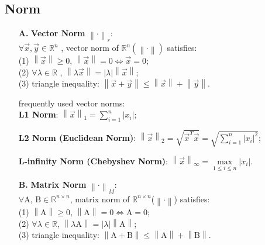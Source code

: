 \documentclass[12pt]{book}
\theoremstyle{definition}
\theoremstyle{remark}
\begin{document}
\subsection{Norm}
\begin{enumerate}
    \item [\textbf{A.}] \textbf{Vector Norm} $\left \| \cdot  \right \| _{r} $:\\
    $\forall\vec{x},\vec{y}\in\mathbb{R}^{n}$ , vector norm of $\mathbb{R}^{n} (\left \| \cdot  \right \|)$ satisfies:\\
(1) $\left \| \vec{x}  \right \|\ge0$, $\left \| \vec{x}  \right \|=0\Leftrightarrow \vec{x}=0$; \\
(2) $\forall\lambda\in\mathbb{R}$ , $\left \| \lambda\vec{x} \right \| =\left | \lambda  \right | \left \| \vec{x} \right \|$; \\
(3) triangle inequality: $\left \| \vec{x}+\vec{y} \right \| \le \left \| \vec{x} \right \| + \left \| \vec{y} \right \|$.\\
\begin{notionbox}[Note]
frequently used vector norms:\\
\textbf{L1 Norm}: $\left \| \vec{x} \right \|_{1} =\sum_{i=1}^{n}\left | x_{i}  \right |$;

\textbf{L2 Norm (Euclidean Norm)}: $\left \| \vec{x} \right \|_{2} =\sqrt{\vec{x}^{T}\vec{x}} =\sqrt{\sum_{i=1}^{n}\left | x_{i}  \right | ^{2} }$;

\textbf{L-infinity Norm (Chebyshev Norm)}: $\left \| \vec{x} \right \|_{\infty} =\underset{1\le i\le n}{\max}\left | x_{i} \right |$.
\end{notionbox}

\item [\textbf{B.}] \textbf{Matrix Norm} $\left \| \cdot \right \| _{M}$:\\\label{sec:matrix norm origin}
$\forall\mathrm{A}$, $\mathrm{B}\in\mathbb{R}^{n\times n}$, matrix norm of $\mathbb{R}^{n\times n}$($\left \| \cdot \right \|$) satisfies:\\
(1) $\left \|\mathrm{A}\right \|\ge0$, $\left \|\mathrm{A}\right \|=0\Leftrightarrow \mathrm{A}=0$;\\
(2) $\forall\lambda\in\mathbb{R}$, $\left \| \lambda\mathrm{A} \right \| =\left | \lambda  \right | \left \| \mathrm{A} \right \|$;\\
(3) triangle inequality: $\left \| \mathrm{A+B}\right \| \le \left \| \mathrm{A} \right \| + \left \|\mathrm{B}\right \|$.\\


\end{enumerate}
\end{document}
